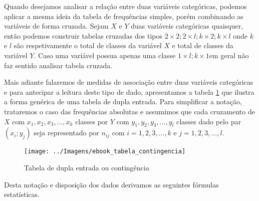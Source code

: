 \documentclass[11pt,]{style/krantz}
\theoremstyle{definition}
\theoremstyle{definition}
\theoremstyle{definition}
\theoremstyle{remark}
\begin{document}
Quando desejamos analisar a relação entre duas variáveis categóricas, podemos aplicar a mesma ideia da tabela de frequências simples, porém combinando as variáveis de forma cruzada. Sejam \(X\) e \(Y\) duas variáveis categóricas quaisquer, então podemos construir tabelas cruzadas dos tipos \(2 \times 2; 2 \times l; k \times 2;k \times l\) onde \(k\) e \(l\) são respetivamente o total de classes da variável \(X\) e total de classes da variável \(Y\). Caso uma variável possua apenas uma classe \(1 \times l; k \times 1\)em geral não faz sentido analisar tabela cruzada.

Mais adiante falaremos de medidas de associação entre duas variáveis categóricas e para antecipar a leitura deste tipo de dado, apresentamos a tabela \ref{fig:figtf} que ilustra a forma genérica de uma tabela de dupla entrada. Para simplificar a notação, trataremos o caso das frequências absolutas e assumimos que cada cruzamento de \(X\) com \(x_1,x_2,x_3,...,x_k\) classes por \(Y\) com \(y_1,y_2,y_3,...,y_l\) classes dado pelo par \((x_i;y_j)\) seja representado por \(n_{ij}\) com \(i=1,2,3,...,k\) e \(j=1,2,3,...,l\).

\begin{figure}[H]

{\centering \texttt{[image: ../Imagens/ebook\_tabela\_contingencia]} 

}

\caption{Tabela de dupla entrada ou contingência}\label{fig:figtf}
\end{figure}

Desta notação e disposição dos dados derivamos as seguintes fórmulas estatísticas.
\end{document}
